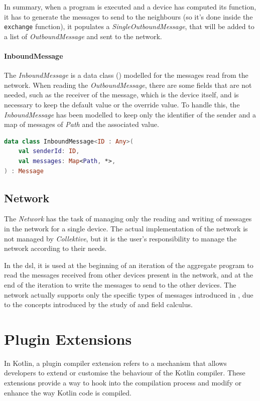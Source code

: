 In summary, when a program is executed and a device has computed its function, it has to generate the messages to send to
the neighbours (so it's done inside the \texttt{exchange} function), it populates a \emph{SingleOutboundMessage},
that will be added to a list of \emph{OutboundMessage} and sent to the network.

\paragraph{InboundMessage}
The \emph{InboundMessage} is a data class () modelled for the messages read from the network.
When reading the \emph{OutboundMessage}, there are some fields that are not needed, such as the receiver of the message,
which is the device itself, and is necessary to keep the default value or the override value.
To handle this, the \emph{InboundMessage} has been modelled to keep only the identifier of the sender and
a map of messages of \emph{Path} and the associated value.

\begin{lstlisting}[language=kt,label={lst:inbound}, caption={Inbound message data class.}]
data class InboundMessage<ID : Any>(
    val senderId: ID,
    val messages: Map<Path, *>,
) : Message
\end{lstlisting}

\subsection{Network}
\label{subsec:network}
The \emph{Network} has the task of managing only the reading and writing of messages in the network for a single device.
The actual implementation of the network is not managed by \emph{Collektive}, but it is the user's responsibility to manage
the network according to their needs.

In the \ac{dsl}, it is used at the beginning of an iteration of the aggregate program to read the messages received from
other devices present in the network, and at the end of the iteration to write the messages to send to the other devices.
The network actually supports only the specific types of messages introduced in , due to the
concepts introduced by the study of \xc{} and field calculus.

\section{Plugin Extensions}
\label{sec:plugin-extensions}
In Kotlin, a plugin compiler extension refers to a mechanism that allows developers to extend or customise the behaviour
of the Kotlin compiler.
These extensions provide a way to hook into the compilation process and modify or enhance the way Kotlin code is compiled.

